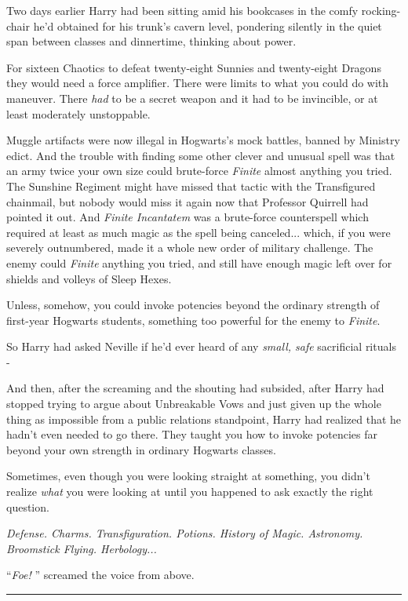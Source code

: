 Two days earlier Harry had been sitting amid his bookcases in the comfy
rocking-chair he'd obtained for his trunk's cavern level, pondering
silently in the quiet span between classes and dinnertime, thinking
about power.

For sixteen Chaotics to defeat twenty-eight Sunnies and twenty-eight
Dragons they would need a force amplifier. There were limits to what you
could do with maneuver. There \emph{had} to be a secret weapon and it
had to be invincible, or at least moderately unstoppable.

Muggle artifacts were now illegal in Hogwarts's mock battles, banned by
Ministry edict. And the trouble with finding some other clever and
unusual spell was that an army twice your own size could brute-force
\emph{Finite} almost anything you tried. The Sunshine Regiment might
have missed that tactic with the Transfigured chainmail, but nobody
would miss it again now that Professor Quirrell had pointed it out. And
\emph{Finite Incantatem} was a brute-force counterspell which required
at least as much magic as the spell being canceled... which, if you
were severely outnumbered, made it a whole new order of military
challenge. The enemy could \emph{Finite} anything you tried, and still
have enough magic left over for shields and volleys of Sleep Hexes.

Unless, somehow, you could invoke potencies beyond the ordinary strength
of first-year Hogwarts students, something too powerful for the enemy to
\emph{Finite}.

So Harry had asked Neville if he'd ever heard of any \emph{small, safe}
sacrificial rituals -

And then, after the screaming and the shouting had subsided, after Harry
had stopped trying to argue about Unbreakable Vows and just given up the
whole thing as impossible from a public relations standpoint, Harry had
realized that he hadn't even needed to go there. They taught you how to
invoke potencies far beyond your own strength in ordinary Hogwarts
classes.

Sometimes, even though you were looking straight at something, you
didn't realize \emph{what} you were looking at until you happened to ask
exactly the right question.

\emph{Defense. Charms. Transfiguration. Potions. History of Magic.
Astronomy. Broomstick Flying. Herbology...}

``\emph{Foe!} '' screamed the voice from above.

\begin{center}\rule{3in}{0.4pt}\end{center}

